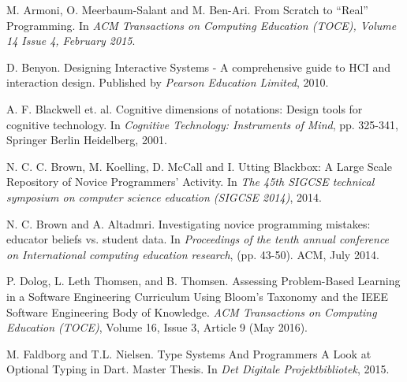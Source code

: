 \documentclass[10pt]{sigplanconf}
\begin{document}
\begin{thebibliography}{}
\softraggedright

M. Armoni, O. Meerbaum-Salant and M. Ben-Ari. \newblock From Scratch to “Real” Programming. \newblock In \emph{ACM Transactions on Computing Education (TOCE), Volume 14 Issue 4, February 2015}.

D. Benyon. \newblock Designing Interactive Systems - A comprehensive guide to HCI and interaction design. \newblock Published by \emph{Pearson Education Limited}, 2010.

A. F. Blackwell et. al. \newblock Cognitive dimensions of notations: Design tools for cognitive technology. \newblock In \emph{Cognitive Technology: Instruments of Mind}, pp. 325-341, Springer Berlin Heidelberg, 2001.

N. C. C. Brown, M. Koelling, D. McCall and I. Utting \newblock Blackbox: A Large Scale Repository of Novice Programmers’ Activity. \newblock In \emph{The 45th SIGCSE technical symposium on computer science education (SIGCSE 2014)}, 2014.

N. C. Brown and A. Altadmri. \newblock Investigating novice programming mistakes: educator beliefs vs. student data. \newblock In \emph{Proceedings of the tenth annual conference on International computing education research}, (pp. 43-50). ACM, July 2014.

P. Dolog, L. Leth Thomsen, and B. Thomsen. \newblock Assessing Problem-Based Learning in a Software Engineering Curriculum Using Bloom’s Taxonomy and the IEEE Software Engineering Body of Knowledge. \newblock \emph{ACM Transactions on Computing Education (TOCE)}, Volume 16, Issue 3, Article 9 (May 2016).

M. Faldborg and T.L. Nielsen. \newblock Type Systems And Programmers \: A Look at Optional Typing in Dart. \newblock Master Thesis. In \emph{Det Digitale Projektbibliotek}, 2015.


\end{thebibliography}
\end{document}

